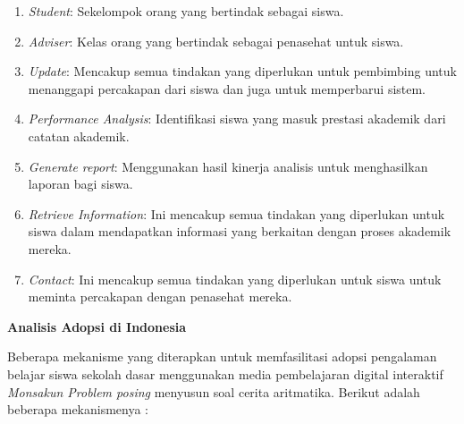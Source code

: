 \begin{enumerate}
        \begin{enumerate}
            \renewcommand{\labelenumii}{\arabic{enumii}.}
            \item \textit{Student}: Sekelompok orang yang bertindak sebagai siswa.
            \item \textit{Adviser}: Kelas orang yang bertindak sebagai penasehat untuk siswa.
            \item \textit{Update}: Mencakup semua tindakan yang diperlukan untuk pembimbing untuk menanggapi percakapan dari siswa dan juga untuk memperbarui sistem.
            \item \textit{Performance Analysis}: Identifikasi siswa yang masuk prestasi akademik dari catatan akademik.
            \item \textit{Generate report}: Menggunakan hasil kinerja analisis untuk menghasilkan laporan bagi siswa.
            \item \textit{Retrieve Information}: Ini mencakup semua tindakan yang diperlukan untuk siswa dalam mendapatkan informasi yang berkaitan dengan proses akademik mereka.
            \item \textit{Contact}: Ini mencakup semua tindakan yang diperlukan untuk siswa untuk meminta percakapan dengan penasehat mereka.
        \end{enumerate}

        \textbf{Analisis Adopsi di Indonesia}

        Beberapa mekanisme yang diterapkan untuk memfasilitasi adopsi pengalaman belajar siswa sekolah dasar menggunakan media pembelajaran digital interaktif \textit{Monsakun Problem posing} menyusun soal cerita aritmatika. Berikut adalah beberapa mekanismenya :


\end{enumerate}
